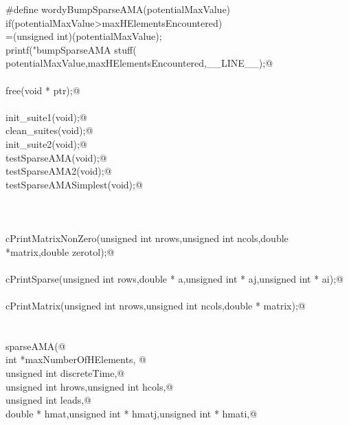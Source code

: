 \documentclass[12pt]{article}
\begin{document}
\begin{flushleft}
\begin{minipage}{\linewidth}
\begin{list}{}{}
\mbox{}\verb@#define wordyBumpSparseAMA(potentialMaxValue) \@\\
\mbox{}\verb@        if(potentialMaxValue>maxHElementsEncountered) \@\\
\mbox{}\verb@maxHElementsEncountered=(unsigned int)(potentialMaxValue);\@\\
\mbox{}\verb@        printf("bumpSparseAMA stuff(%d,%d) at line %d\n",\@\\
\mbox{}\verb@        potentialMaxValue,maxHElementsEncountered,__LINE__);@\\
\mbox{}\verb@@\\
\mbox{}\verb@void free(void * ptr);@\\
\mbox{}\verb@@\\
\mbox{}\verb@int init_suite1(void);@\\
\mbox{}\verb@int clean_suites(void);@\\
\mbox{}\verb@int init_suite2(void);@\\
\mbox{}\verb@void testSparseAMA(void);@\\
\mbox{}\verb@void testSparseAMA2(void);@\\
\mbox{}\verb@void testSparseAMASimplest(void);@\\
\mbox{}\verb@@\\
\mbox{}\verb@@\\
\mbox{}\verb@@\\
\mbox{}\verb@void cPrintMatrixNonZero(unsigned int nrows,unsigned int ncols,double *matrix,double zerotol);@\\
\mbox{}\verb@@\\
\mbox{}\verb@void cPrintSparse(unsigned int rows,double * a,unsigned int * aj,unsigned int * ai);@\\
\mbox{}\verb@@\\
\mbox{}\verb@void cPrintMatrix(unsigned int nrows,unsigned int ncols,double * matrix);@\\
\mbox{}\verb@@\\
\mbox{}\verb@@\\
\mbox{}\verb@void sparseAMA(@\\
\mbox{}\verb@unsigned int *maxNumberOfHElements,             @\\
\mbox{}\verb@    unsigned int discreteTime,@\\
\mbox{}\verb@    unsigned int hrows,unsigned int hcols,@\\
\mbox{}\verb@    unsigned int leads,@\\
\mbox{}\verb@    double * hmat,unsigned int * hmatj,unsigned int * hmati,@\\

\end{list}
\end{minipage}
\end{flushleft}
\end{document}

